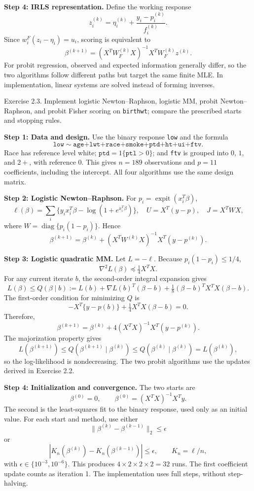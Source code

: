 \documentclass[answers,12pt,addpoints]{exam}
\begin{document}
\begin{questions}
\begin{solution}
\textbf{Step 4: IRLS representation.}
Define the working response
\[
z_i^{(k)}=\eta_i^{(k)}+\frac{y_i-p_i^{(k)}}{f_i^{(k)}}.
\]
Since $w_i^F(z_i-\eta_i)=u_i$, scoring is equivalent to
\[
\boxed{\beta^{(k+1)}=(X^TW_F^{(k)}X)^{-1}X^TW_F^{(k)}z^{(k)}.}
\]
For probit regression, observed and expected information generally differ,
so the two algorithms follow different paths but target the same finite MLE.
In implementation, linear systems are solved instead of forming inverses.
\end{solution}

\question Exercise 2.3. Implement logistic Newton--Raphson, logistic MM,
probit Newton--Raphson, and probit Fisher scoring on \texttt{birthwt};
compare the prescribed starts and stopping rules.
\begin{solution}
\textbf{Step 1: Data and design.}
Use the binary response \texttt{low} and the formula
\[
\texttt{low}\sim\texttt{age+lwt+race+smoke+ptd+ht+ui+ftv}.
\]
Race has reference level white; $\texttt{ptd}=1\{\texttt{ptl}>0\}$;
and \texttt{ftv} is grouped into $0$, $1$, and $2+$, with reference $0$.
This gives $n=189$ observations and $p=11$ coefficients, including the intercept.
All four algorithms use the same design matrix.

\textbf{Step 2: Logistic Newton--Raphson.}
For $p_i=\operatorname{expit}(x_i^T\beta)$,
\[
\ell(\beta)=\sum_i\{y_ix_i^T\beta-\log(1+e^{x_i^T\beta})\},
\quad U=X^T(y-p),\quad J=X^TWX,
\]
where $W=\operatorname{diag}\{p_i(1-p_i)\}$. Hence
\[
\boxed{\beta^{(k+1)}=\beta^{(k)}+
(X^TW^{(k)}X)^{-1}X^T(y-p^{(k)}).}
\]

\textbf{Step 3: Logistic quadratic MM.}
Let $L=-\ell$. Because $p_i(1-p_i)\leq1/4$,
\[
\nabla^2L(\beta)\preceq\tfrac14 X^TX.
\]
For any current iterate $b$, the second-order integral expansion gives
\[
L(\beta)\leq Q(\beta\mid b):=
L(b)+\nabla L(b)^T(\beta-b)
+\tfrac18(\beta-b)^TX^TX(\beta-b).
\]
The first-order condition for minimizing $Q$ is
\[
-X^T\{y-p(b)\}+\tfrac14X^TX(\beta-b)=0.
\]
Therefore,
\[
\boxed{\beta^{(k+1)}=\beta^{(k)}+
4(X^TX)^{-1}X^T(y-p^{(k)}).}
\]
The majorization property gives
\[
L(\beta^{(k+1)})\leq Q(\beta^{(k+1)}\mid\beta^{(k)})
\leq Q(\beta^{(k)}\mid\beta^{(k)})=L(\beta^{(k)}),
\]
so the log-likelihood is nondecreasing.
The two probit algorithms use the updates derived in Exercise 2.2.

\textbf{Step 4: Initialization and convergence.}
The two starts are
\[
\beta^{(0)}=0,\qquad
\beta^{(0)}=(X^TX)^{-1}X^Ty.
\]
The second is the least-squares fit to the binary response, used only as an
initial value. For each start and method, use either
\[
\|\beta^{(k)}-\beta^{(k-1)}\|_2\leq\epsilon
\]
or
\[
|K_n(\beta^{(k)})-K_n(\beta^{(k-1)})|\leq\epsilon,
\qquad K_n=\ell/n,
\]
with $\epsilon\in\{10^{-3},10^{-6}\}$. This produces
$4\times2\times2\times2=32$ runs. The first coefficient update counts as
iteration 1. The implementation uses full steps, without step-halving.


\end{solution}
\end{questions}
\end{document}
